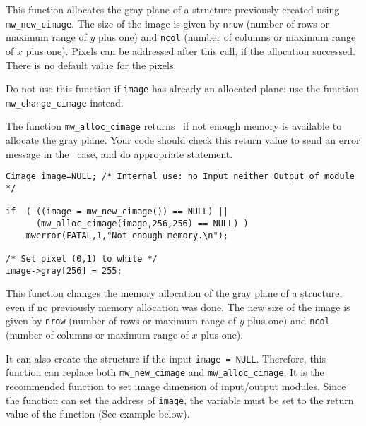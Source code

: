 \Description
This function allocates the gray plane of a \cimage structure previously
created using \verb+mw_new_cimage+. The size of the image is given by 
\verb+nrow+ (number of rows or maximum range of $y$ plus one) and \verb+ncol+
(number of columns or maximum range of $x$ plus one).
Pixels can be addressed after this call, if the allocation successed. There is
no default value for the pixels.

Do not use this function if \verb+image+ has already an allocated plane: use
the function \verb+mw_change_cimage+ instead.

The function \verb+mw_alloc_cimage+ returns \Null\ if not enough memory is available to allocate the gray plane. Your code should check this return value to 
send an error message in the \Null\ case, and do appropriate statement.

\Next
\Example
\begin{verbatim}
Cimage image=NULL; /* Internal use: no Input neither Output of module */

if  ( ((image = mw_new_cimage()) == NULL) ||
      (mw_alloc_cimage(image,256,256) == NULL) )
    mwerror(FATAL,1,"Not enough memory.\n");

/* Set pixel (0,1) to white */
image->gray[256] = 255;

\end{verbatim}

\newpage %

\Description
This function changes the memory allocation of the gray plane of a \cimage
structure, even if no previously memory allocation was done.
The new size of the image is given by \verb+nrow+ (number of rows or maximum 
range of $y$ plus one) and \verb+ncol+ (number of columns or maximum range of 
$x$ plus one). 

It can also create the structure if the input \verb+image = NULL+.
Therefore, this function can replace both \verb+mw_new_cimage+ and
\verb+mw_alloc_cimage+. It is the recommended function to set image 
dimension of input/output modules. Since the function can set the 
address of \verb+image+, the variable must be set to the return value of 
the function (See example below).

